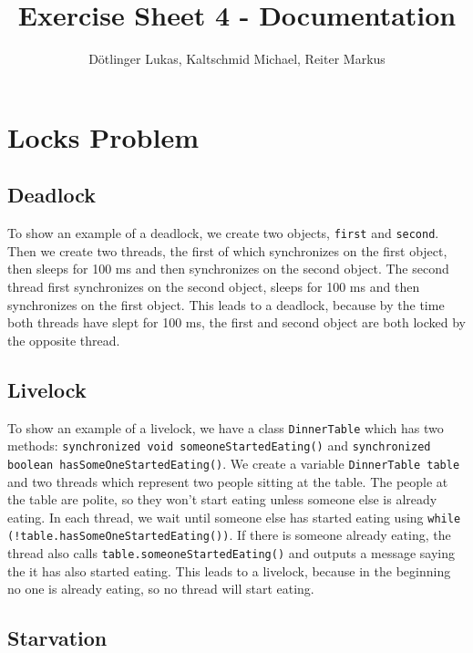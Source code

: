 \documentclass{article}
\begin{document}
	\title{Exercise Sheet 4 - Documentation}
	\date{}
	\author{Dötlinger Lukas, Kaltschmid Michael, Reiter Markus}

	\maketitle

  \section{Locks Problem}

  \subsection{Deadlock}

  To show an example of a deadlock, we create two objects, \texttt{first} and \texttt{second}. Then we create two threads, the first of which synchronizes on the first object, then sleeps for 100 ms and then synchronizes on the second object. The second thread first synchronizes on the second object, sleeps for 100 ms and then synchronizes on the first object. This leads to a deadlock, because by the time both threads have slept for 100 ms, the first and second object are both locked by the opposite thread.

  \subsection{Livelock}

  To show an example of a livelock, we have a class \texttt{DinnerTable} which has two methods: \texttt{synchronized void someoneStartedEating()} and \texttt{synchronized boolean hasSomeOneStartedEating()}. We create a variable \texttt{DinnerTable table} and two threads which represent two people sitting at the table. The people at the table are polite, so they won't start eating unless someone else is already eating. In each thread, we wait until someone else has started eating using \texttt{while (!table.hasSomeOneStartedEating())}. If there is someone already eating, the thread also calls \texttt{table.someoneStartedEating()} and outputs a message saying the it has also started eating. This leads to a livelock, because in the beginning no one is already eating, so no thread will start eating.

  \subsection{Starvation}
\end{document}
